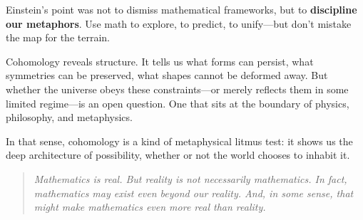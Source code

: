 \medskip


Einstein’s point was not to dismiss mathematical frameworks, but to \textbf{discipline our metaphors}.  
Use math to explore, to predict, to unify—but don’t mistake the map for the terrain.

Cohomology reveals structure. It tells us what forms can persist, what symmetries can be preserved, what shapes cannot be deformed away.  
But whether the universe obeys these constraints—or merely reflects them in some limited regime—is an open question. One that sits at the boundary of physics, philosophy, and metaphysics.


In that sense, cohomology is a kind of metaphysical litmus test: it shows us the deep architecture of possibility, whether or not the world chooses to inhabit it.

\begin{quote}
\textit{Mathematics is real. But reality is not necessarily mathematics.  In fact, mathematics may exist even beyond our reality. And, in some sense, that might make mathematics even more real than reality.}
\end{quote}
